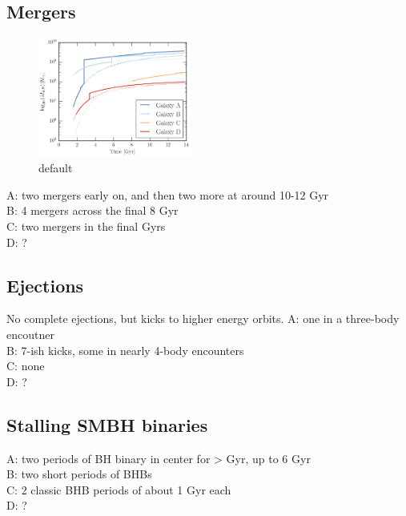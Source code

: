 \documentclass[english, apj]{emulateapj}
\begin{document}
\subsection{Mergers}
\begin{figure}[htbp]
\begin{center}
\includegraphics[width=0.45\textwidth]{plots/masses_ABCD.png}
\caption{default}
\label{default}
\end{center}
\end{figure}




\noindent A: two mergers early on, and then two more at around 10-12 Gyr\\
B: 4 mergers across the final 8 Gyr\\
C: two mergers in the final Gyrs\\
D: ?\\


\subsection{Ejections}
No complete ejections, but kicks to higher energy orbits.
\noindent A: one in a three-body encoutner\\
B: 7-ish kicks, some in nearly 4-body encounters\\
C: none\\
D: ?\\

\subsection{Stalling SMBH binaries}
A: two periods of BH binary in center for > Gyr, up to 6 Gyr\\
B: two short periods of BHBs\\
C: 2 classic BHB periods of about 1 Gyr each\\
D: ?
\end{document}
